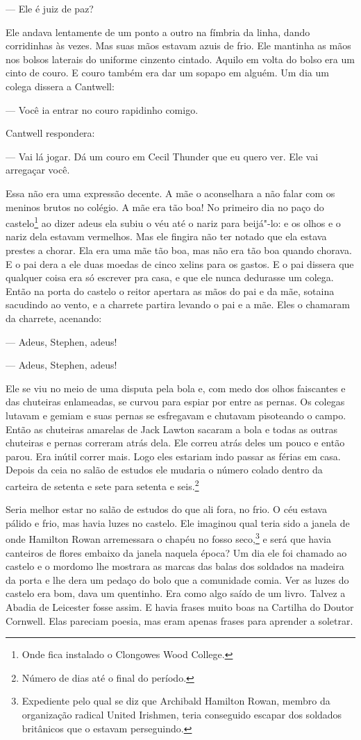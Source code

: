  --- Ele é juiz de paz?

Ele andava lentamente de um ponto a outro na fímbria da linha, dando
corridinhas às vezes. Mas suas mãos estavam azuis de frio. Ele mantinha
as mãos nos bolsos laterais do uniforme cinzento cintado. Aquilo em volta do bolso era um cinto
de couro. E couro também era dar um sopapo em
alguém. Um dia um colega dissera a Cantwell:

 --- Você ia entrar no couro rapidinho comigo.

Cantwell respondera:

 --- Vai lá jogar. Dá um couro em Cecil Thunder que eu quero ver. Ele vai
arregaçar você.

Essa não era uma expressão decente. A mãe o aconselhara a não falar com
os meninos brutos no colégio. A mãe era tão boa! No primeiro dia no
paço do castelo\footnote{ Onde fica instalado o Clongowes Wood
College.} ao dizer adeus ela subiu o véu até o nariz para beijá"-lo: e
os olhos e o nariz dela estavam vermelhos. Mas ele fingira não ter
notado que ela estava prestes a chorar. Ela era uma mãe tão boa, mas
não era tão boa quando chorava. E o pai dera a ele duas moedas de cinco
xelins para os gastos. E o pai dissera que qualquer coisa era só escrever
pra casa, e que ele nunca dedurasse um colega. Então na porta do
castelo o reitor apertara as mãos do pai e da mãe, sotaina sacudindo ao
vento, e a charrete partira levando o pai e a mãe. Eles o chamaram
da charrete, acenando:

 --- Adeus, Stephen, adeus!

 --- Adeus, Stephen, adeus!

Ele se viu no meio de uma disputa pela bola e, com medo dos olhos
faiscantes e das chuteiras enlameadas, se curvou para espiar por entre
as pernas. Os colegas lutavam e gemiam e suas pernas se esfregavam e
chutavam pisoteando o campo. Então as chuteiras amarelas de Jack Lawton
sacaram a bola e todas as outras chuteiras e pernas correram atrás
dela. Ele correu atrás deles um pouco e então parou. Era inútil correr
mais. Logo eles estariam indo passar as férias em casa. Depois da ceia
no salão de estudos ele mudaria o número colado dentro da carteira de
setenta e sete para setenta e seis.\footnote{ Número de dias até o final
do período.}

Seria melhor estar no salão de estudos do que ali fora, no frio. O céu
estava pálido e frio, mas havia luzes no castelo. Ele imaginou qual
teria sido a janela de onde Hamilton Rowan arremessara o chapéu no
fosso seco,\footnote{ Expediente pelo qual se diz que Archibald Hamilton
Rowan, membro da organização radical United Irishmen, teria conseguido 
escapar dos soldados britânicos que o estavam
perseguindo.} e será que havia canteiros de flores embaixo da janela
naquela época? Um dia ele foi chamado ao castelo e o mordomo lhe
mostrara as marcas das balas dos soldados na madeira da porta e lhe
dera um pedaço do bolo que a comunidade comia. Ver as luzes do castelo
era bom, dava um quentinho. Era como algo saído de um livro. Talvez a 
Abadia de Leicester fosse assim. E havia frases muito boas na Cartilha   
do Doutor Cornwell. Elas pareciam poesia, mas eram apenas frases para    
aprender a soletrar.

